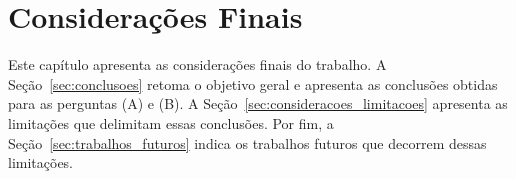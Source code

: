 \chapter{Considerações Finais}\label{chap:consideracoes}


Este capítulo apresenta as considerações finais do trabalho. A Seção~\ref{sec:conclusoes}
retoma o objetivo geral e apresenta as conclusões obtidas para as perguntas (A) e (B). A
Seção~\ref{sec:consideracoes_limitacoes} apresenta as limitações que delimitam essas
conclusões. Por fim, a Seção~\ref{sec:trabalhos_futuros} indica os trabalhos futuros que
decorrem dessas limitações.

